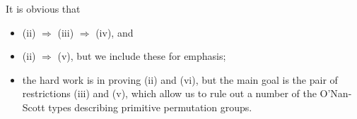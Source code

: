 \documentclass[xcolor=dvipsnames,11pt,hide notes]{beamer}
\theoremstyle{definition}
\theoremstyle{remark}
\numberwithin{theorem}{section}
\numberwithin{claim}{section}
\numberwithin{equation}{section}
\numberwithin{conjecture}{section}
\begin{document}
\begin{frame}[label=Example7elementPreziImplications]{}
It is obvious that 
    \begin{itemize}
    \item (ii) $\Rightarrow$ (iii) $\Rightarrow$ (iv), and  
    \item (ii) $\Rightarrow$ (v), but we include these for
      emphasis;
    \item the hard work is in proving (ii) and (vi), but
      the main goal is the pair of restrictions (iii) and (v), which allow us to rule
      out a number of the O'Nan-Scott types describing primitive permutation
      groups. 
  \end{itemize}
\end{frame}



































\end{document}
